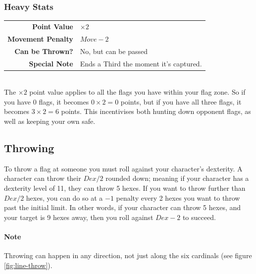 \subsubsection{Heavy Stats}
\begin{tabular}{r|l}
    \textbf{Point Value} & $\times 2$ \\
    \textbf{Movement Penalty} & $Move-2$ \\
    \textbf{Can be Thrown?} & No, but can be passed \\
    \textbf{Special Note} & Ends a Third the moment it’s captured. \\
\end{tabular}\\

The $\times 2$ point value applies to all the flags you have within your flag zone. So if you have 0 flags, it becomes $0 \times 2 = 0$ points, but if you have all three flags, it becomes $3 \times 2 = 6$ points. This incentivises both hunting down opponent flags, as well as keeping your own safe.
\subsection{Throwing}
To throw a flag at someone you must roll against your character’s dexterity. 
A character can throw their $Dex / 2$ rounded down; meaning if your character has a dexterity level of 11, they can throw 5 hexes.
If you want to throw further than $Dex/2$ hexes, you can do so at a $-1$ penalty every 2 hexes you want to throw past the initial limit. In other words, if your character can throw 5 hexes, and your target is 9 hexes away, then you roll against $Dex-2$ to succeed.

\paragraph{Note} Throwing can happen in any direction, not just along the six cardinals (see figure \ref{fig:line-throw}).

